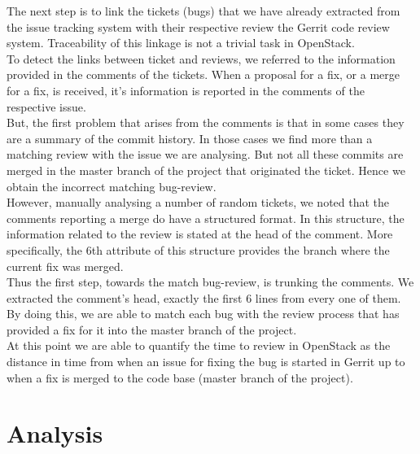 \documentclass[10pt, conference]{IEEEtran}
\begin{document}
The next step is to link the tickets (bugs) that we have already
extracted from the issue tracking system with their 
respective review the Gerrit code review system. Traceability of
this linkage is not a trivial task in OpenStack.
\\
To detect the links between ticket and reviews, we referred to 
the information provided in the comments of the tickets. 
When a proposal for a fix, or a merge for a fix, is received, 
it's information is reported in the comments of the respective issue.
\\
But, the first problem that arises from the comments is that 
in some cases they are a summary of the commit history. 
In those cases we find more than a matching review 
with the issue we are analysing. But not all these commits are merged in
the master branch of the project that originated the ticket. Hence we 
obtain the incorrect matching bug-review.
\\
However, manually analysing a number of random tickets, we noted that 
the comments reporting a merge do have a structured format. 
In this structure, the information related to the review
is stated at the head of the comment. More specifically, the 6th 
attribute of this structure provides the branch where the current fix 
was merged.
\\
Thus the first step, towards the match bug-review, is trunking the comments. 
We extracted the comment's head, exactly the first 6 lines from every one of them. 
By doing this, we are able to match each bug with the review process that has provided 
a fix for it into the master branch of the project.
\\
At this point we are able to quantify the time to review in
OpenStack as the distance in time from when an issue for fixing 
the bug is started 
in Gerrit up to when a fix is merged to the code base (master branch of the project).

\section{Analysis}
\end{document}
